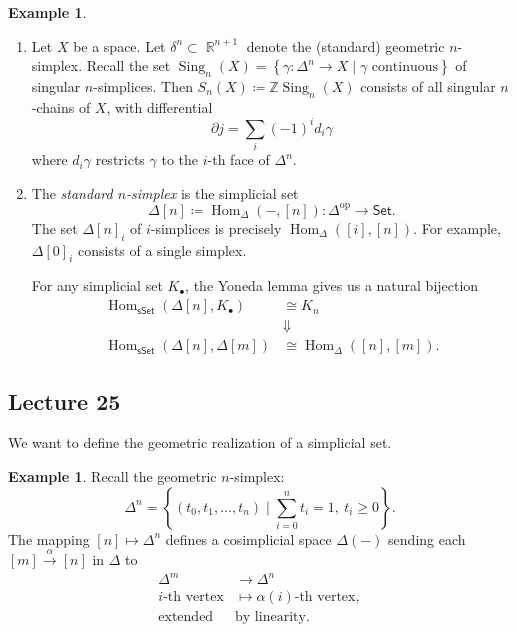 \documentclass[10pt,letterpaper,cm]{nupset}
\theoremstyle{definition}
\newtheorem{exmp}[defn]{Example}
\theoremstyle{theorem}
\theoremstyle{remark}
\DeclareMathOperator{\R}{\mathbb{R}}
\newcommand{\Z}{\mathbb Z}
\newcommand{\1}{\mathbb{1}}
\newcommand{\0}{\vec 0}
\DeclareMathOperator{\Hom}{Hom}
\DeclareMathOperator{\op}{op}
\DeclareMathOperator{\sing}{Sing}
\newcommand{\be}{\begin{enumerate}}
\newcommand{\ee}{\end{enumerate}}
\begin{document}
\begin{exmp} $ $
\be
\item Let $X$ be a space. Let $\delta^n\subset \R^{n+1}$ denote the (standard) geometric $n$-simplex. Recall the set \linebreak$\sing_n(X) = \left\{ \gamma : \Delta^n \to X \mid \text{$\gamma$ continuous} \right\}$ of singular $n$-simplices. Then $S_n(X) \coloneqq \Z{\sing_n(X)}$ consists of all singular $n$-chains of $X$, with differential
\[
\partial{j} = \sum_i \left({-1}\right)^id_i{\gamma}
\] where $d_i{\gamma}$ restricts $\gamma$ to the $i$-th face of $\Delta^n$.
\item The \textit{standard $n$-simplex} is the simplicial set 
\[
\Delta\left[n\right] \coloneqq \Hom_{\Delta}({-}, \left[n\right]) : \Delta^{\op} \to \mathsf{Set}.
\] The set $\Delta\left[n\right]_i$ of $i$-simplices  is precisely $\Hom_{\Delta}(\left[i\right], \left[n\right])$. For example, $\Delta\left[0\right]_i$ consists of a single simplex.

For any simplicial set $K_{\bullet}$, the Yoneda lemma gives us a natural bijection
\begin{align*}
\Hom_{\mathsf{sSet}}(\Delta\left[n\right], K_{\bullet}) &  \cong K_n
\\ & \Downarrow
\\ \Hom_{\mathsf{sSet}}(\Delta\left[n\right], \Delta\left[m\right]) &  \cong \Hom_{\Delta}(\left[n\right], \left[m\right])
.\end{align*}
\ee
\end{exmp}

\subsection{Lecture 25}

We want to define the geometric realization of a simplicial set.

\begin{exmp}
Recall the geometric $n$-simplex:
\[
\Delta^n = \left\{\left(t_0, t_1, \ldots, t_n\right) \mid \sum_{i=0}^n t_i = 1, \ t_i \geq 0  \right\}
.\] The mapping $\left[n\right] \mapsto \Delta^n$ defines a cosimplicial space $\Delta({-})$ sending each $\left[m\right] \xrightarrow{\alpha} \left[n\right]$  in $\Delta$ to
\begin{align*}
\Delta^m & \to \Delta^n
\\ \text{$i$-th vertex} & \mapsto \text{$\alpha(i)$-th vertex},
\\ \text{extended } & \text{by linearity}.
 \end{align*}
\end{exmp}
\end{document}
